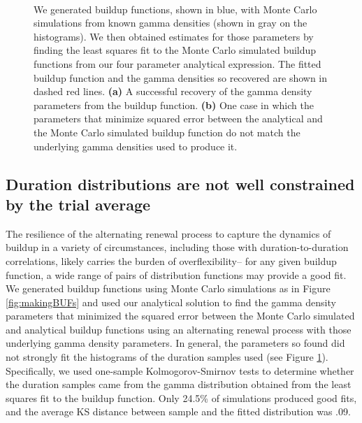 \begin{figure}
	\centering
	 \\
	\vspace{20pt}
	
	\caption{We generated buildup functions, shown in blue, with Monte Carlo simulations from known gamma densities (shown in gray on the histograms). We then obtained estimates for those parameters by finding the least squares fit to the Monte Carlo simulated buildup functions from our four parameter analytical expression. The fitted buildup function and the gamma densities so recovered are shown in dashed red lines. \textbf{(a)} A successful recovery of the gamma density parameters from the buildup function. \textbf{(b)} One case in which the parameters that minimize squared error between the analytical and the Monte Carlo simulated buildup function do not match the underlying gamma densities used to produce it.}
	\label{fig:reverse_fit_4par}
\end{figure}

\subsection{Duration distributions are not well constrained by the trial average}

The resilience of the alternating renewal process to capture the dynamics of buildup in a variety of circumstances, including those with duration-to-duration correlations, likely carries the burden of overflexibility-- for any given buildup function, a wide range of pairs of distribution functions may provide a good fit. We generated buildup functions using Monte Carlo simulations as in Figure \ref{fig:makingBUFs} and used our analytical solution to find the gamma density parameters that minimized the squared error between the Monte Carlo simulated and analytical buildup functions using an alternating renewal process with those underlying gamma density parameters. In general, the parameters so found did not strongly fit the histograms of the duration samples used (see Figure \ref{fig:reverse_fit_4par}).
Specifically, we used one-sample Kolmogorov-Smirnov tests to determine whether the duration samples came from the gamma distribution obtained from the least squares fit to the buildup function. Only 24.5\% of simulations produced good fits, and the average KS distance between sample and the fitted distribution was .09.

